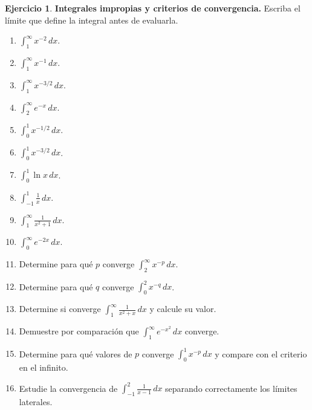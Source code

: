 \documentclass[12pt]{article}
\theoremstyle{definition}
\newtheorem{Ejer}[teorema]{Ejercicio}
\theoremstyle{remark}
\newcommand{\dd}{\,dx}
\begin{document}
\begin{Ejer}\textbf{Integrales impropias y criterios de convergencia.} Escriba el límite que define la integral antes de evaluarla.
\begin{enumerate}[resume=banco3]
\item $\displaystyle\int_1^\infty x^{-2}\dd$.
\item $\displaystyle\int_1^\infty x^{-1}\dd$.
\item $\displaystyle\int_1^\infty x^{-3/2}\dd$.
\item $\displaystyle\int_2^\infty e^{-x}\dd$.
\item $\displaystyle\int_0^1x^{-1/2}\dd$.
\item $\displaystyle\int_0^1x^{-3/2}\dd$.
\item $\displaystyle\int_0^1\ln x\dd$.
\item $\displaystyle\int_{-1}^1\frac1x\dd$.
\item $\displaystyle\int_1^\infty\frac{1}{x^2+1}\dd$.
\item $\displaystyle\int_0^\infty e^{-2x}\dd$.
\item Determine para qué $p$ converge $\displaystyle\int_2^\infty x^{-p}\dd$.
\item Determine para qué $q$ converge $\displaystyle\int_0^2x^{-q}\dd$.
\item Determine si converge $\displaystyle\int_1^\infty\frac1{x^2+x}\,dx$ y calcule su valor.
\item Demuestre por comparación que $\displaystyle\int_1^\infty e^{-x^2}\,dx$ converge.
\item Determine para qué valores de $p$ converge $\displaystyle\int_0^1x^{-p}\,dx$ y compare con el criterio en el infinito.
\item Estudie la convergencia de $\displaystyle\int_{-1}^2\frac1{x-1}\,dx$ separando correctamente los límites laterales.
\end{enumerate}
\end{Ejer}
\end{document}
